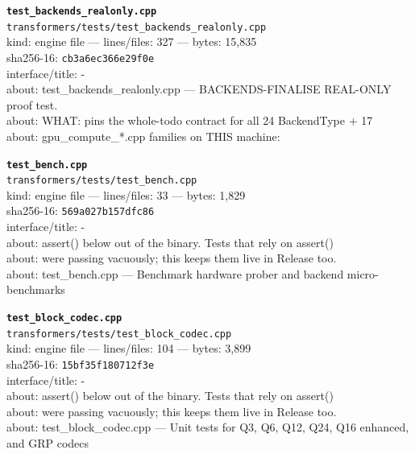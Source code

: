 \noindent\textbf{\texttt{test\_backends\_realonly.cpp}}\\
\texttt{transformers/tests/test\_backends\_realonly.cpp}\\
kind: engine file --- lines/files: 327 --- bytes: 15,835\\
sha256-16: \texttt{cb3a6ec366e29f0e}\\
interface/title: -\\
about: test\_backends\_realonly.cpp — BACKENDS-FINALISE REAL-ONLY proof test.\\
about: WHAT: pins the whole-todo contract for all 24 BackendType + 17\\
about: gpu\_compute\_*.cpp families on THIS machine:\\
\vspace*{6.0pt}
\newpage

\noindent\textbf{\texttt{test\_bench.cpp}}\\
\texttt{transformers/tests/test\_bench.cpp}\\
kind: engine file --- lines/files: 33 --- bytes: 1,829\\
sha256-16: \texttt{569a027b157dfc86}\\
interface/title: -\\
about: assert() below out of the binary. Tests that rely on assert()\\
about: were passing vacuously; this keeps them live in Release too.\\
about: test\_bench.cpp — Benchmark hardware prober and backend micro-benchmarks\\
\vspace*{6.0pt}

\noindent\textbf{\texttt{test\_block\_codec.cpp}}\\
\texttt{transformers/tests/test\_block\_codec.cpp}\\
kind: engine file --- lines/files: 104 --- bytes: 3,899\\
sha256-16: \texttt{15bf35f180712f3e}\\
interface/title: -\\
about: assert() below out of the binary. Tests that rely on assert()\\
about: were passing vacuously; this keeps them live in Release too.\\
about: test\_block\_codec.cpp — Unit tests for Q3, Q6, Q12, Q24, Q16 enhanced, and GRP codecs\\
\vspace*{6.0pt}

